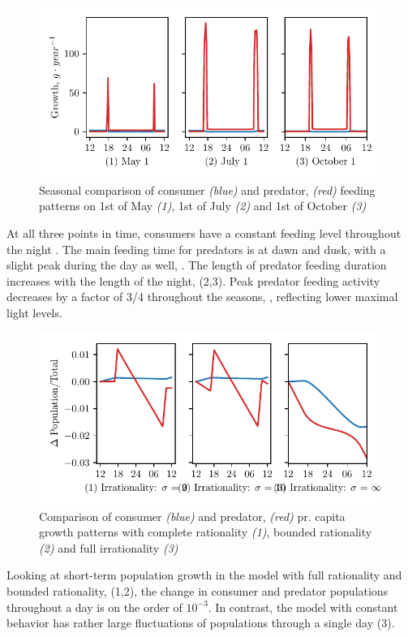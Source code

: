 \begin{figure}[H]
\includegraphics{plots/growth_short_rational.pdf}
\caption{Seasonal comparison of consumer \emph{(blue)} and predator, \emph{(red)} feeding patterns on 1st of May \emph{(1)}, 1st of July \emph{(2)} and 1st of October \emph{(3)}}
\label{fig:growth_short_rational}
\end{figure}
At all three points in time, consumers have a constant feeding level throughout the night . The main feeding time for predators is at dawn and dusk, with a slight peak during the day as well, . The length of predator feeding duration increases with the length of the night,  (2,3). Peak predator feeding activity decreases by a factor of 3/4 throughout the seasons, , reflecting lower maximal light levels.
\begin{figure}[H]
  \begin{centering}
\includegraphics{plots/pop_dyn_comp_full_semi_none.pdf}
\end{centering}
\caption{Comparison of consumer \emph{(blue)} and predator, \emph{(red)} pr. capita growth patterns with complete rationality \emph{(1)}, bounded rationality \emph{(2)} and full irrationality \emph{(3)}}
\label{fig:pop_short_term}
\end{figure}
Looking at short-term population growth in the model with full rationality and bounded rationality, (1,2), the change in consumer and predator populations throughout a day is on the order of $10^{-3}$. In contrast, the model with constant behavior has rather large fluctuations of populations through a single day (3).

